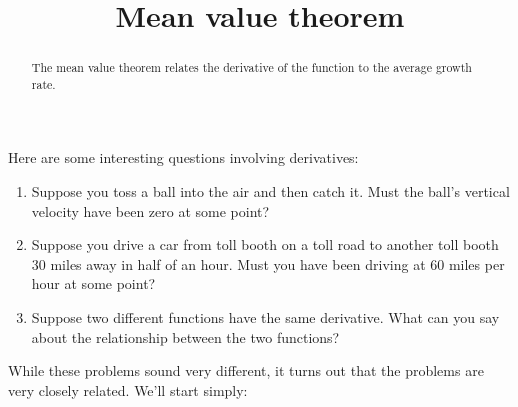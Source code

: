 \documentclass{ximera}
\title{Mean value theorem}
\begin{document}
\begin{abstract}
  The mean value theorem relates the derivative of the function to the
  average growth rate.
\end{abstract}
\maketitle

Here are some  interesting questions involving derivatives:

\begin{enumerate}
\item Suppose you toss a ball into the air and then catch it. Must the
  ball's vertical velocity have been zero at some point?
\item Suppose you drive a car from toll booth on a toll road to
  another toll booth $30$ miles away in half of an hour. Must you have
  been driving at $60$ miles per hour at some point?
\item Suppose two different functions have the same derivative. What
  can you say about the relationship between the two functions?
\end{enumerate}

While these problems sound very different, it turns out that the
problems are very closely related. We'll start simply:
\end{document}
